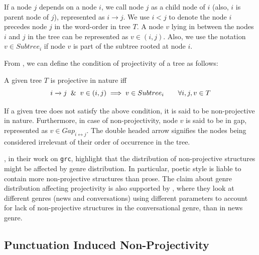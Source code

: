 If a node \(j\) depends on a node \(i\), we call node \(j\) as a child node of \(i\) (also, \(i\) is parent node of \(j\)), represented as \(i \xrightarrow{} j\). We use \(i < j\) to denote the node \(i\) precedes node \(j\) in the word-order in tree \(T\). A node \(v\) lying in between the nodes \(i\) and \(j\) in the tree can be represented as \(v \in (i,j)\). Also, we use the notation \(v \in Subtree_{i}\) if node \(v\) is part of the subtree rooted at node \(i\). 

From \cite{Havelka}, we can define the condition of projectivity of a tree as follows:

\theoremstyle{definition}
\begin{definition}
\label{def:projectivity}
A given tree \(T\) is projective in nature iff
\begin{equation}
\label{eqn:projectivity}
    i \xrightarrow{} j \And v \in (i, j) \implies v \in Subtree_{i} \qquad \forall i, j, v \in T 
\end{equation}

If a given tree does not satisfy the above condition, it is said to be non-projective in nature. Furthermore, in case of non-projectivity, node \(v\) is said to be in gap, represented as \(v \in Gap_{i\leftrightarrow j}\). The double headed arrow signifies the nodes being considered irrelevant of their order of occurrence in the tree.
\end{definition}

\cite{mambriniNonProj}, in their work on \verb|grc|, highlight that the distribution of non-projective structures might be affected by genre distribution. In particular, poetic style is liable to contain more non-projective structures than prose. The claim about genre distribution affecting projectivity is also supported by \cite{nonprojgenre}, where they look at different genres (news and conversations) using different parameters to account for lack of non-projective structures in the conversational genre, than in news genre. %

\subsection{Punctuation Induced Non-Projectivity}
\label{ssec:punct-nonproj}

